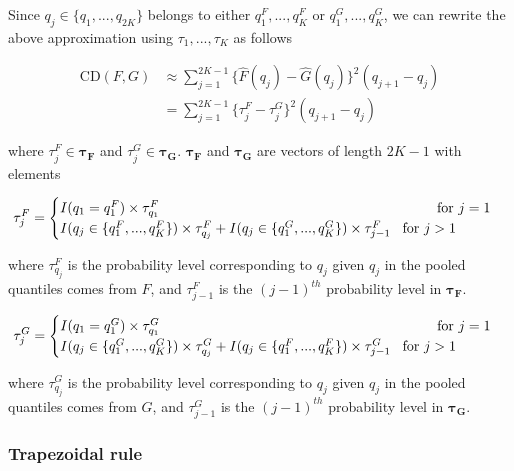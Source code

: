 \documentclass[
]{article}
\begin{document}
Since \(q_j\in \{q_1, ..., q_{2K}\}\) belongs to either
\(q_{1}^F,...,q_{K}^F\) or \(q_{1}^G,...,q_{K}^G\), we can rewrite the
above approximation using \(\tau_1,...,\tau_K\) as follows

\begin{align}
\text{CD}(F,G) 
&\approx\sum^{2K-1}_{j=1}\{\hat{F}(q_j)-\hat{G}(q_j)\}^2(q_{j+1}-q_{j})\\
&=\sum^{2K-1}_{j=1}\{\tau^F_j-\tau^G_j\}^2(q_{j+1}-q_{j})
\end{align}

where \(\tau^F_j \in \boldsymbol{\tau_F}\) and
\(\tau^G_j \in \boldsymbol{\tau_G}\). \(\boldsymbol{\tau_F}\) and
\(\boldsymbol{\tau_G}\) are vectors of length \(2K-1\) with elements

\[
\tau^F_j=
\begin{cases}
I(q_1=q_1^F)\times \tau_{q_1}^F\hspace{7cm}\text{for }j=1\\
I(q_j\in \{q_1^F, ..., q_{K}^F\})\times \tau_{q_j}^F+I(q_j\in \{q_1^G, ..., q_{K}^G\})\times \tau_{j-1}^F\hspace{0.3cm}\text{for }j>1\\
\end{cases}
\]

where \(\tau_{q_j}^F\) is the probability level corresponding to \(q_j\)
given \(q_j\) in the pooled quantiles comes from \(F\), and
\(\tau_{j-1}^F\) is the \((j-1)^{th}\) probability level in
\(\boldsymbol{\tau_F}\).

\[
\tau^G_j=
\begin{cases}
I(q_1=q_1^G)\times \tau_{q_1}^G\hspace{7cm}\text{for }j=1\\
I(q_j\in \{q_1^G, ..., q_{K}^G\})\times \tau_{q_j}^G+I(q_j\in \{q_1^F,...,q_{K}^F\})\times \tau_{j-1}^G\hspace{0.3cm}\text{for }j>1\\
\end{cases}
\]

where \(\tau_{q_j}^G\) is the probability level corresponding to \(q_j\)
given \(q_j\) in the pooled quantiles comes from \(G\), and
\(\tau_{j-1}^G\) is the \((j-1)^{th}\) probability level in
\(\boldsymbol{\tau_G}\).

\hypertarget{trapezoidal-rule}{%
\subsubsection{Trapezoidal rule}\label{trapezoidal-rule}}
\end{document}
